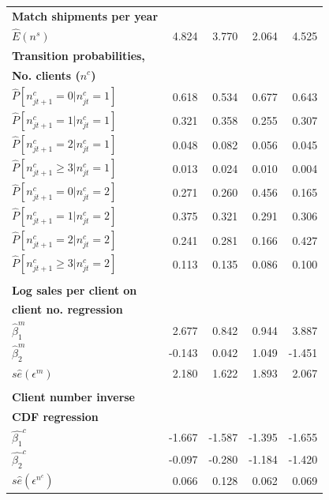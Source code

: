 \begin{small}
\begin{longtable}{l|rrrr}
\textbf{Match shipments per year} &  &  &  &  \\ 
$\widehat{E}\left( n^{s}\right) $ & 4.824 & 3.770 & 2.064 & 4.525 \\
\textbf{Transition probabilities, } &  &  &  &  \\ 
\textbf{No. clients (}$n^{c}$\textbf{)} &  &  &  &  \\ 
$\widehat{P}[n_{jt+1}^{c}=0|n_{jt}^{c}=1]$ & 0.618 & 0.534 & 0.677 & 0.643
\\ 
$\widehat{P}[n_{jt+1}^{c}=1|n_{jt}^{c}=1]$ & 0.321 & 0.358 & 0.255 & 0.307
\\ 
$\widehat{P}[n_{jt+1}^{c}=2|n_{jt}^{c}=1]$ & 0.048 & 0.082 & 0.056 & 0.045
\\ 
$\widehat{P}[n_{jt+1}^{c}\geq 3|n_{jt}^{c}=1]$ & 0.013 & 0.024 & 0.010 & 
0.004 \\ 
$\widehat{P}[n_{jt+1}^{c}=0|n_{jt}^{c}=2]$ & 0.271 & 0.260 & 0.456 & 0.165
\\ 
$\widehat{P}[n_{jt+1}^{c}=1|n_{jt}^{c}=2]$ & 0.375 & 0.321 & 0.291 & 0.306
\\ 
$\widehat{P}[n_{jt+1}^{c}=2|n_{jt}^{c}=2]$ & 0.241 & 0.281 & 0.166 & 0.427
\\ 
$\widehat{P}[n_{jt+1}^{c}\geq 3|n_{jt}^{c}=2]$ & 0.113 & 0.135 & 0.086 & 
0.100 \\ 
&  &  &  &  \\ 
\textbf{Log sales per client on} &  &  &  &  \\ 
\textbf{client no. regression} &  &  &  &  \\ 
$\widehat{\beta }_{1}^{m}$ & 2.677 & 0.842 & 0.944 & 3.887 \\ 
$\widehat{\beta }_{2}^{m}$ & -0.143 & 0.042 & 1.049 & -1.451 \\ 
$s\widehat{e}(\epsilon ^{m})$ & 2.180 & 1.622 & 1.893 & 2.067 \\ 
&  &  &  &  \\ 
\textbf{Client number inverse} &  &  &  &  \\ 
\textbf{CDF regression} &  &  &  &  \\ 
$\widehat{\beta _{1}}^{c}$ & -1.667 & -1.587 & -1.395 & -1.655 \\ 
$\widehat{\beta _{2}}^{c}$ & -0.097 & -0.280 & -1.184 & -1.420 \\ 
$s\widehat{e}(\epsilon ^{n^{c}})$ & 0.066 & 0.128 & 0.062 & 0.069 \\ \hline
\end{longtable}
\end{small}
